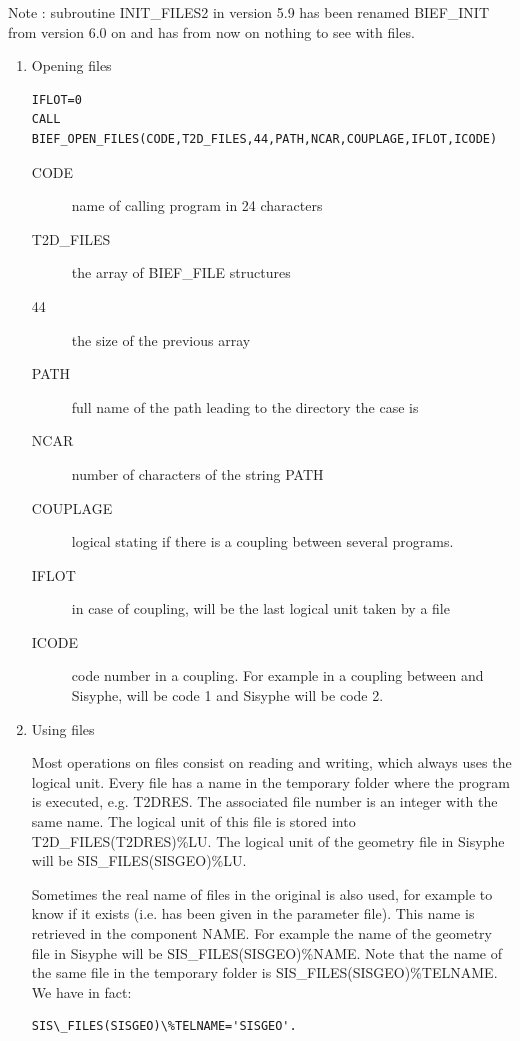 Note : subroutine INIT\_FILES2 in \bief version 5.9 has been renamed BIEF\_INIT
from version 6.0 on and has from now on nothing to see with files.
\begin{enumerate}
  \item{Opening files}

\begin{lstlisting}[language=TelFortran]
IFLOT=0
CALL BIEF_OPEN_FILES(CODE,T2D_FILES,44,PATH,NCAR,COUPLAGE,IFLOT,ICODE)
\end{lstlisting}
\begin{description}
  \item [CODE] name of calling program in 24 characters
  \item [T2D\_FILES] the array of BIEF\_FILE structures
  \item [44] the size of the previous array
  \item [PATH] full name of the path leading to the directory the case is
  \item [NCAR] number of characters of the string PATH
  \item [COUPLAGE] logical stating if there is a coupling between several programs.
  \item [IFLOT] in case of coupling, will be the last logical unit taken by a file
  \item [ICODE] code number in a coupling. For example in a coupling between
     and Sisyphe,  will be code 1 and Sisyphe will be
    code 2.
\end{description}
\item Using files

Most operations on files consist on reading and writing, which always uses the
logical unit. Every file has a name in the temporary folder where the program
is executed, e.g. T2DRES. The associated file number is an integer with the
same name. The logical unit of this file is stored into T2D\_FILES(T2DRES)\%LU.
The logical unit of the geometry file in Sisyphe will be
SIS\_FILES(SISGEO)\%LU.

Sometimes the real name of files in the original is also used, for example to
know if it exists (i.e. has been given in the parameter file). This name is
retrieved in the component NAME. For example the name of the geometry file in
Sisyphe will be SIS\_FILES(SISGEO)\%NAME. Note that the name of the same file
in the temporary folder is SIS\_FILES(SISGEO)\%TELNAME. We have in fact:

\begin{lstlisting}[language=TelFortran]
SIS\_FILES(SISGEO)\%TELNAME='SISGEO'.
\end{lstlisting}


\end{enumerate}
